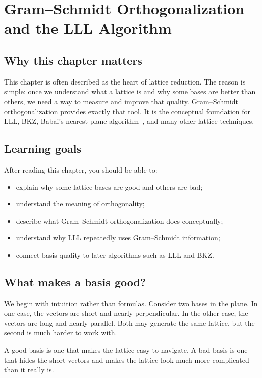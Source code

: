 \chapter{Gram--Schmidt Orthogonalization and the LLL Algorithm}
\label{ch:lll}

\section{Why this chapter matters}
This chapter is often described as the heart of lattice reduction. The reason is simple: once we understand what a lattice is and why some bases are better than others, we need a way to measure and improve that quality. Gram--Schmidt orthogonalization provides exactly that tool. It is the conceptual foundation for LLL, BKZ, Babai's nearest plane algorithm~\cite{babai1986}, and many other lattice techniques.

\section{Learning goals}
After reading this chapter, you should be able to:

\begin{itemize}
  \item explain why some lattice bases are good and others are bad;
  \item understand the meaning of orthogonality;
  \item describe what Gram--Schmidt orthogonalization does conceptually;
  \item understand why LLL repeatedly uses Gram--Schmidt information;
  \item connect basis quality to later algorithms such as LLL and BKZ.
\end{itemize}

\section{What makes a basis good?}
We begin with intuition rather than formulas. Consider two bases in the plane. In one case, the vectors are short and nearly perpendicular. In the other case, the vectors are long and nearly parallel. Both may generate the same lattice, but the second is much harder to work with.

A good basis is one that makes the lattice easy to navigate. A bad basis is one that hides the short vectors and makes the lattice look much more complicated than it really is.

